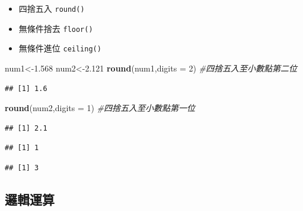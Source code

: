 \documentclass[]{book}
\newenvironment{Shaded}{\begin{snugshade}}{\end{snugshade}}
\newcommand{\KeywordTok}[1]{\textcolor[rgb]{0.13,0.29,0.53}{\textbf{{#1}}}}
\newcommand{\DataTypeTok}[1]{\textcolor[rgb]{0.13,0.29,0.53}{{#1}}}
\newcommand{\DecValTok}[1]{\textcolor[rgb]{0.00,0.00,0.81}{{#1}}}
\newcommand{\FloatTok}[1]{\textcolor[rgb]{0.00,0.00,0.81}{{#1}}}
\newcommand{\CommentTok}[1]{\textcolor[rgb]{0.56,0.35,0.01}{\textit{{#1}}}}
\newcommand{\NormalTok}[1]{{#1}}
\providecommand{\tightlist}{%
  \setlength{\itemsep}{0pt}\setlength{\parskip}{0pt}}
\theoremstyle{definition}
\theoremstyle{definition}
\theoremstyle{remark}
\begin{document}
\begin{itemize}
\tightlist
\item
  四捨五入 \texttt{round()}
\item
  無條件捨去 \texttt{floor()}
\item
  無條件進位 \texttt{ceiling()}
\end{itemize}

\begin{Shaded}
\begin{Highlighting}[]
\NormalTok{num1<-}\FloatTok{1.568}
\NormalTok{num2<-}\FloatTok{2.121}
\KeywordTok{round}\NormalTok{(num1,}\DataTypeTok{digits =} \DecValTok{2}\NormalTok{) }\CommentTok{#四捨五入至小數點第二位}
\end{Highlighting}
\end{Shaded}

\begin{verbatim}
## [1] 1.6
\end{verbatim}

\begin{Shaded}
\begin{Highlighting}[]
\KeywordTok{round}\NormalTok{(num2,}\DataTypeTok{digits =} \DecValTok{1}\NormalTok{) }\CommentTok{#四捨五入至小數點第一位}
\end{Highlighting}
\end{Shaded}

\begin{verbatim}
## [1] 2.1
\end{verbatim}

\begin{Shaded}
\end{Shaded}

\begin{verbatim}
## [1] 1
\end{verbatim}

\begin{Shaded}
\end{Shaded}

\begin{verbatim}
## [1] 3
\end{verbatim}

\subsection{邏輯運算}
\end{document}
